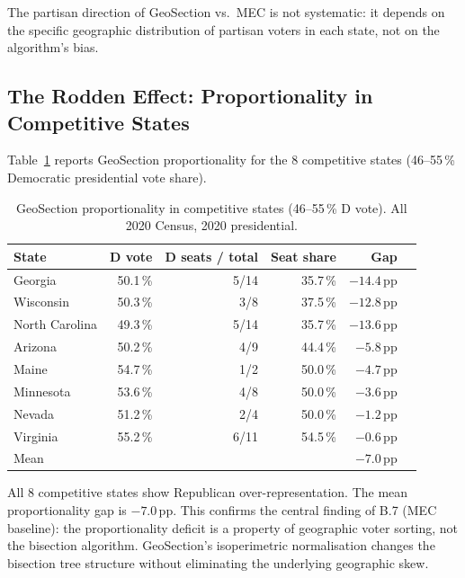 The partisan direction of GeoSection vs.\ MEC is not systematic: it depends
on the specific geographic distribution of partisan voters in each state,
not on the algorithm's bias.

\subsection{The Rodden Effect: Proportionality in Competitive States}

Table~\ref{tab:prop-competitive} reports GeoSection proportionality for
the 8 competitive states (46--55\,\% Democratic presidential vote share).

\begin{table}[h]
\centering
\caption{GeoSection proportionality in competitive states (46--55\,\% D vote).
  All 2020 Census, 2020 presidential.}
\label{tab:prop-competitive}
\begin{tabular}{lrrrrr}
\toprule
State & D vote & D seats / total & Seat share & Gap \\
\midrule
Georgia       & 50.1\,\% & 5/14 & 35.7\,\% & $-14.4$\,pp \\
Wisconsin     & 50.3\,\% & 3/8  & 37.5\,\% & $-12.8$\,pp \\
North Carolina & 49.3\,\% & 5/14 & 35.7\,\% & $-13.6$\,pp \\
Arizona       & 50.2\,\% & 4/9  & 44.4\,\% & $-5.8$\,pp \\
Maine         & 54.7\,\% & 1/2  & 50.0\,\% & $-4.7$\,pp \\
Minnesota     & 53.6\,\% & 4/8  & 50.0\,\% & $-3.6$\,pp \\
Nevada        & 51.2\,\% & 2/4  & 50.0\,\% & $-1.2$\,pp \\
Virginia      & 55.2\,\% & 6/11 & 54.5\,\% & $-0.6$\,pp \\
\midrule
Mean          &          &      &          & $-7.0$\,pp \\
\bottomrule
\end{tabular}
\end{table}

All 8 competitive states show Republican over-representation.
The mean proportionality gap is $-7.0$\,pp.
This confirms the central finding of B.7 (MEC baseline): the proportionality
deficit is a property of geographic voter sorting, not the bisection algorithm.
GeoSection's isoperimetric normalisation changes the bisection tree structure
without eliminating the underlying geographic skew.
